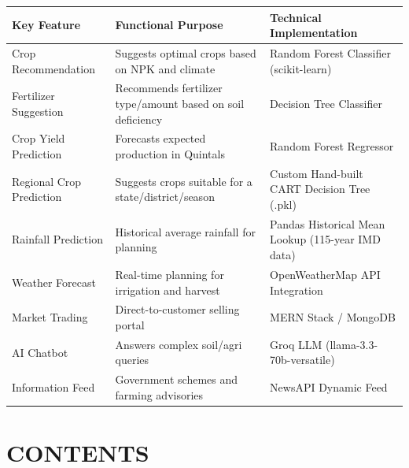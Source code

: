 \documentclass[12pt,a4paper]{report}
\begin{document}
\begin{table}[h!]
\centering
\begin{tabular}{|l|l|l|}
\hline
Key Feature & Functional Purpose & Technical Implementation \\ \hline
Crop Recommendation & Suggests optimal crops based on NPK and climate & Random Forest Classifier (scikit-learn) \\ \hline
Fertilizer Suggestion & Recommends fertilizer type/amount based on soil deficiency & Decision Tree Classifier \\ \hline
Crop Yield Prediction & Forecasts expected production in Quintals & Random Forest Regressor \\ \hline
Regional Crop Prediction & Suggests crops suitable for a state/district/season & Custom Hand-built CART Decision Tree (.pkl) \\ \hline
Rainfall Prediction & Historical average rainfall for planning & Pandas Historical Mean Lookup (115-year IMD data) \\ \hline
Weather Forecast & Real-time planning for irrigation and harvest & OpenWeatherMap API Integration \\ \hline
Market Trading & Direct-to-customer selling portal & MERN Stack / MongoDB \\ \hline
AI Chatbot & Answers complex soil/agri queries & Groq LLM (llama-3.3-70b-versatile) \\ \hline
Information Feed & Government schemes and farming advisories & NewsAPI Dynamic Feed \\ \hline
\end{tabular}
\end{table}

\newpage

\section{CONTENTS}
\end{document}
